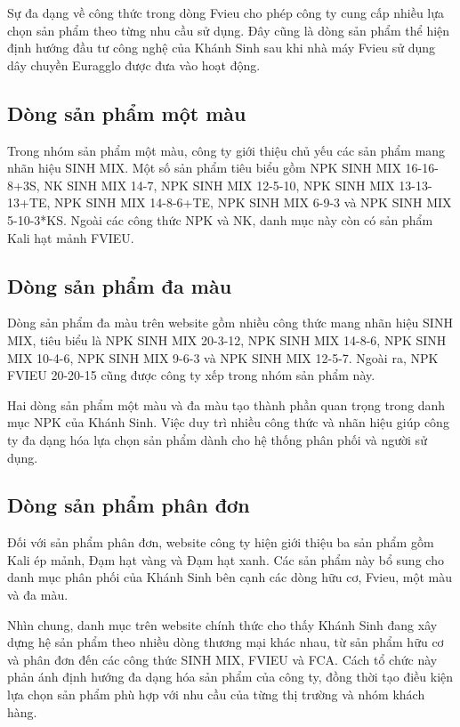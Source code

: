 Sự đa dạng về công thức trong dòng Fvieu cho phép công ty cung cấp nhiều lựa chọn sản phẩm theo từng nhu cầu sử dụng. Đây cũng là dòng sản phẩm thể hiện định hướng đầu tư công nghệ của Khánh Sinh sau khi nhà máy Fvieu sử dụng dây chuyền Euragglo được đưa vào hoạt động.\cite{company-internal-documents}

\subsection{Dòng sản phẩm một màu}
Trong nhóm sản phẩm một màu, công ty giới thiệu chủ yếu các sản phẩm mang nhãn hiệu SINH MIX. Một số sản phẩm tiêu biểu gồm NPK SINH MIX 16-16-8+3S, NK SINH MIX 14-7, NPK SINH MIX 12-5-10, NPK SINH MIX 13-13-13+TE, NPK SINH MIX 14-8-6+TE, NPK SINH MIX 6-9-3 và NPK SINH MIX 5-10-3*KS. Ngoài các công thức NPK và NK, danh mục này còn có sản phẩm Kali hạt mảnh FVIEU.\cite{company-internal-documents}

\subsection{Dòng sản phẩm đa màu}
Dòng sản phẩm đa màu trên website gồm nhiều công thức mang nhãn hiệu SINH MIX, tiêu biểu là NPK SINH MIX 20-3-12, NPK SINH MIX 14-8-6, NPK SINH MIX 10-4-6, NPK SINH MIX 9-6-3 và NPK SINH MIX 12-5-7. Ngoài ra, NPK FVIEU 20-20-15 cũng được công ty xếp trong nhóm sản phẩm này.\cite{company-internal-documents}

Hai dòng sản phẩm một màu và đa màu tạo thành phần quan trọng trong danh mục NPK của Khánh Sinh. Việc duy trì nhiều công thức và nhãn hiệu giúp công ty đa dạng hóa lựa chọn sản phẩm dành cho hệ thống phân phối và người sử dụng.

\subsection{Dòng sản phẩm phân đơn}
Đối với sản phẩm phân đơn, website công ty hiện giới thiệu ba sản phẩm gồm Kali ép mảnh, Đạm hạt vàng và Đạm hạt xanh. Các sản phẩm này bổ sung cho danh mục phân phối của Khánh Sinh bên cạnh các dòng hữu cơ, Fvieu, một màu và đa màu.\cite{company-internal-documents}

Nhìn chung, danh mục trên website chính thức cho thấy Khánh Sinh đang xây dựng hệ sản phẩm theo nhiều dòng thương mại khác nhau, từ sản phẩm hữu cơ và phân đơn đến các công thức SINH MIX, FVIEU và FCA. Cách tổ chức này phản ánh định hướng đa dạng hóa sản phẩm của công ty, đồng thời tạo điều kiện lựa chọn sản phẩm phù hợp với nhu cầu của từng thị trường và nhóm khách hàng.
